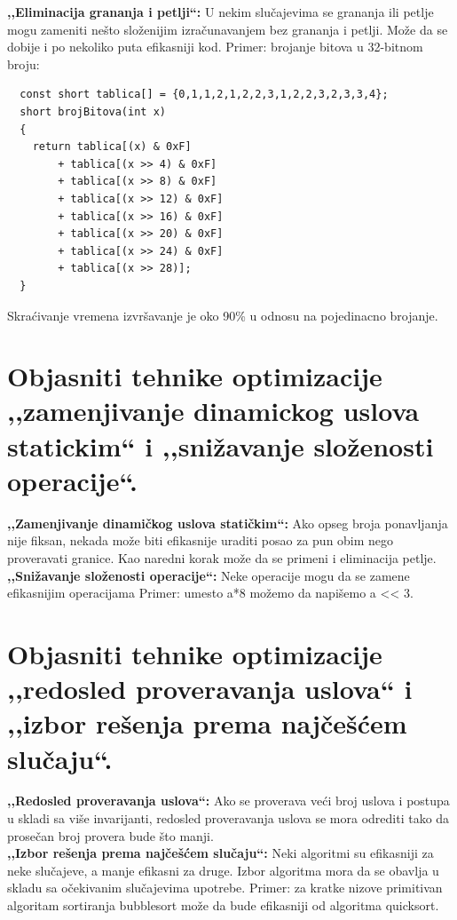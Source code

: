 \documentclass[a4paper]{article}
\begin{document}
  \textbf{,,Eliminacija grananja i petlji``:} U nekim slučajevima se grananja ili petlje mogu 
  zameniti nešto složenijim izračunavanjem bez grananja i petlji. Može da se dobije i po nekoliko 
  puta efikasniji kod. Primer: brojanje bitova u 32-bitnom broju:
\begin{lstlisting}
  const short tablica[] = {0,1,1,2,1,2,2,3,1,2,2,3,2,3,3,4};
  short brojBitova(int x)
  {
    return tablica[(x) & 0xF]
        + tablica[(x >> 4) & 0xF]
        + tablica[(x >> 8) & 0xF]
        + tablica[(x >> 12) & 0xF]
        + tablica[(x >> 16) & 0xF]
        + tablica[(x >> 20) & 0xF]
        + tablica[(x >> 24) & 0xF]
        + tablica[(x >> 28)];
  }\end{lstlisting} 
  Skraćivanje vremena izvršavanje je oko 90\% u odnosu na pojedinacno brojanje.
  
\section{Objasniti tehnike optimizacije ,,zamenjivanje dinamickog uslova statickim`` i 
         ,,snižavanje složenosti operacije``.}
  \textbf{,,Zamenjivanje dinamičkog uslova statičkim``:} Ako opseg broja ponavljanja nije fiksan, 
  nekada može biti efikasnije uraditi posao za pun obim nego proveravati granice. 
  Kao naredni korak može da se primeni i eliminacija petlje.\\
  
  \textbf{,,Snižavanje složenosti operacije``:} Neke operacije mogu da se zamene efikasnijim operacijama 
  Primer: umesto a*8 možemo da napišemo a << 3.
  
\section{Objasniti tehnike optimizacije ,,redosled proveravanja uslova`` i 
         ,,izbor rešenja prema najčešćem slučaju``.}
  \textbf{,,Redosled proveravanja uslova``:} Ako se proverava veći broj uslova i postupa u skladi 
  sa više invarijanti, redosled proveravanja uslova se mora odrediti tako da prosečan broj 
  provera bude što manji.\\
  
  \textbf{,,Izbor rešenja prema najčešćem slučaju``:} Neki algoritmi su efikasniji za neke slučajeve, 
  a manje efikasni za druge. Izbor algoritma mora da se obavlja u skladu sa očekivanim slučajevima 
  upotrebe. Primer: za kratke nizove primitivan algoritam sortiranja bubblesort može da bude 
  efikasniji od algoritma quicksort.
  
\end{document}
